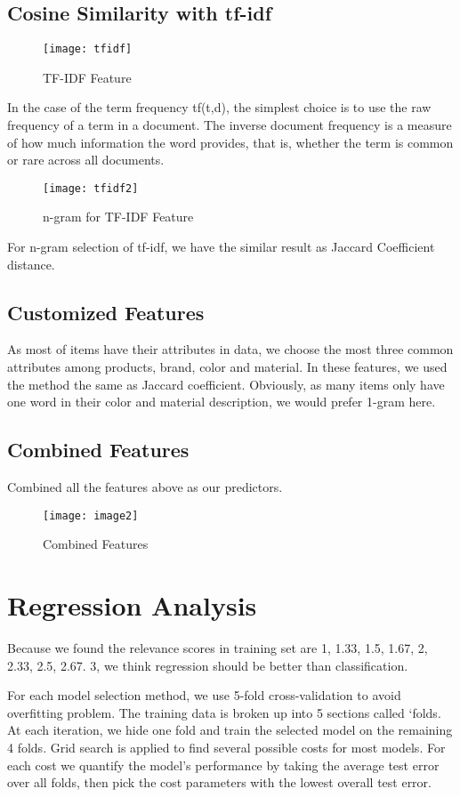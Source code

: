 \documentclass[journal]{IEEEtran}
\begin{document}
\subsection{Cosine Similarity with tf-idf}
\begin{figure}[htbp] 
\centering\texttt{[image: tfidf]} 
\caption{TF-IDF Feature}\label{fig:7} 
\end{figure} 
In the case of the term frequency tf(t,d), the simplest choice is to use the raw frequency of a term in a document. The inverse document frequency is a measure of how much information the word provides, that is, whether the term is common or rare across all documents.
\begin{figure}[htbp] 
\centering\texttt{[image: tfidf2]} 
\caption{n-gram for TF-IDF Feature}\label{fig:8} 
\end{figure} 
For n-gram selection of tf-idf, we have the similar result as Jaccard Coefficient distance.
\newpage
\subsection{Customized Features}
As most of items have their attributes in data, we choose the most three common attributes among products, brand, color and material. In these features, we used the method the same as Jaccard coefficient. Obviously, as many items only have one word in their color and material description, we would prefer 1-gram here.
\subsection{Combined Features}
Combined all the features above as our predictors.
\begin{figure}[htbp] 
\centering\texttt{[image: image2]} 
\caption{Combined Features}\label{fig:9} 
\end{figure} 
\section{Regression Analysis}
Because we found the relevance scores in training set are 1, 1.33, 1.5, 1.67, 2, 2.33, 2.5, 2.67. 3, we think regression should be better than classification.

For each model selection method, we use 5-fold cross-validation to avoid overfitting problem. The training data is broken up into 5 sections called ‘folds. At each iteration, we hide one fold and train the selected model on the remaining 4 folds. Grid search is applied to find several possible costs for most models. For each cost we quantify the model’s performance by taking the average test error over all folds, then pick the cost parameters with the lowest overall test error.
\end{document}
